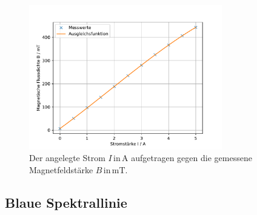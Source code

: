 \begin{figure}
    \centering
    \includegraphics[width=0.75\textwidth]{content/data/magnetfeld.pdf}
    \caption{Der angelegte Strom $I \, \text{in} \, \si{\ampere}$ aufgetragen gegen die gemessene Magnetfeldstärke $B \, \text{in} \, \si{\milli\tesla}$.}
    \label{fig:Magnetfeld}
\end{figure}

\subsection{Blaue Spektrallinie}

